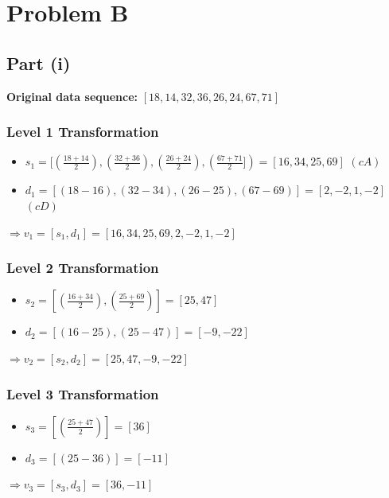 \documentclass[12pt]{article}
\begin{document}
\section{Problem B}

\subsection{Part (i)}

\textbf{Original data sequence:} $[18, 14, 32, 36, 26, 24, 67, 71]$

\subsubsection{Level 1 Transformation}

\begin{itemize}
    \item $s_1 = [(\frac{18 + 14}{2}), (\frac{32 + 36}{2}), (\frac{26 + 24}{2}), (\frac{67 + 71}{2}]) = [16, 34, 25, 69]$ $(cA)$
    \item $d_1 = [(18-16), (32-34), (26-25), (67-69)]  = [2, -2, 1, -2]$ $(cD)$
\end{itemize}

$\Rightarrow v_1 = [s_1, d_1] = [16, 34, 25, 69, 2, -2, 1, -2]$

\subsubsection{Level 2 Transformation}

\begin{itemize}
    \item $s_2 = [(\frac{16+34}{2}), (\frac{25+69}{2})] = [25, 47]$
    \item $d_2 = [(16-25), (25-47)]  = [-9, -22]$
\end{itemize}

$\Rightarrow v_2 = [s_2, d_2] = [25, 47, -9, -22]$

\subsubsection{Level 3 Transformation}

\begin{itemize}
    \item $s_3 = [(\frac{25+47}{2})] = [36]$
    \item $d_3 = [(25-36)]  = [-11]$
\end{itemize}

$\Rightarrow v_3 = [s_3, d_3] = [36, -11]$
\end{document}
